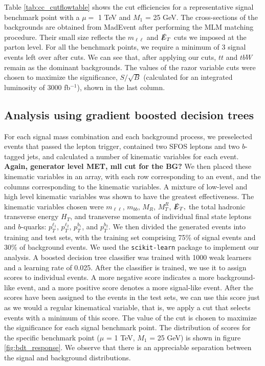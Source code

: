 \documentclass[a4paper,11pt]{article}
\newcommand{\Shufang}[1]{{\bf\color{Maroon}  #1}}
\begin{document}
Table \ref{tab:cc_cutflowtable} shows the cut efficiencies for a representative
signal benchmark point with a $\mu =$ 1 TeV and $M_1$ = 25 GeV.   The
cross-sections of the backgrounds are obtained from MadEvent after performing the MLM matching procedure. Their small size reflects
the $m_{\ell\ell}$ and $\slashed{E}_T$ cuts we imposed at the parton level. For all
the benchmark points, we require a minimum of 3 signal events left over after
cuts. We can see that, after applying our cuts, $tt$ and $tbW$ remain as the
dominant backgrounds. The values of the razor variable cuts were chosen to
maximize the significance, $S/\sqrt{B}$ (calculated for an integrated luminosity
of 3000 fb$^{-1}$), shown in the last column.  

\subsection{Analysis using gradient boosted decision trees}\label{subsec:bdt}

For each signal mass combination and each background process, we preselected
events that passed the lepton trigger, contained two SFOS leptons and two
$b$-tagged jets, and calculated a number of kinematic variables for each event. \Shufang{Again, generator level MET, mll cut for the BG?} We then
placed these kinematic variables in an array, with each row corresponding to an event, and
the columns corresponding to the kinematic variables. A mixture of low-level and high level
kinematic variables was shown to have the greatest effectiveness. The kinematic variables chosen were
$m_{\ell\ell}$, $m_{bb}$, $M_R$, $M_T^R$, $\slashed{E}_T,$ the total hadronic
transverse energy $H_T$,   and transverse momenta of individual final state
leptons and $b$-quarks: $p_T^{\ell_1}$, $p_T^{\ell_2}$, $p_T^{b_1}$, and $p_T^{b_2}$. We
then divided the generated events into training and test sets, with the training set
comprising 75\% of signal events and 30\% of background events.  We used the
\texttt{scikit-learn} package  \cite{Pedregosa2011} to implement our analysis.
A boosted decision tree classifier was trained with 1000 weak learners and a
learning rate of 0.025.  
After the classifier is trained, we use it to assign
scores to individual events. A more negative score indicates a more
background-like event, and a more positive score denotes a more signal-like
event. After the scores have been assigned to the events in the test sets, we
can use this score just as we would a regular kinematical variable, that is, we
apply a cut that selects events with a minimum of this score. The value of the
cut is chosen to maximize the significance for each signal benchmark point. The
distribution of scores for the specific benchmark point ($\mu$ = 1 TeV, $M_1$
= 25 GeV) is shown in figure \ref{fig:bdt_response}. We observe that there is an
appreciable separation between the signal and background distributions.
\end{document}
